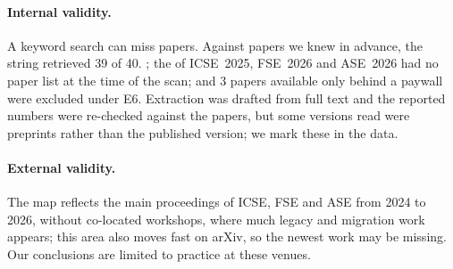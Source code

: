 
\paragraph{Internal validity.} A keyword search can miss papers. Against papers we knew in advance, the string retrieved 39 of 40. ; the  of ICSE~2025, FSE~2026 and ASE~2026 had no paper list at the time of the scan; and 3 papers available only behind a paywall were excluded under E6.  Extraction was drafted from full text and the reported numbers were re-checked against the papers, but some versions read were preprints rather than the published version; we mark these in the data.

\paragraph{External validity.} The map reflects the main proceedings of ICSE, FSE and ASE from 2024 to 2026, without co-located workshops, where much legacy and migration work appears; this area also moves fast on arXiv, so the newest work may be missing. Our conclusions are limited to practice at these venues. 

